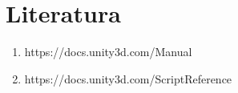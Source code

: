 \section{Literatura}
\begin{enumerate}
	\item https://docs.unity3d.com/Manual
	\item https://docs.unity3d.com/ScriptReference
\end{enumerate}